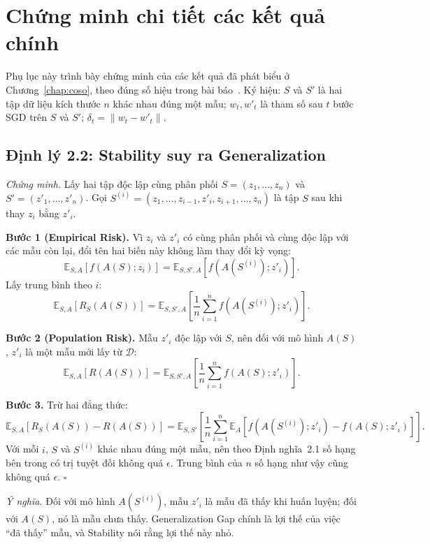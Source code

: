 \chapter{Chứng minh chi tiết các kết quả chính}
\label{app:proofs}

Phụ lục này trình bày chứng minh của các kết quả đã phát biểu ở Chương~\ref{chap:coso}, theo đúng số hiệu trong bài báo~\cite{hardt2016train}. Ký hiệu: $S$ và $S'$ là hai tập dữ liệu kích thước $n$ khác nhau đúng một mẫu; $w_t, w'_t$ là tham số sau $t$ bước SGD trên $S$ và $S'$; $\delta_t = \|w_t - w'_t\|$.

\section{Định lý 2.2: Stability suy ra Generalization}

\textit{Chứng minh.} Lấy hai tập độc lập cùng phân phối $S = (z_1, \ldots, z_n)$ và $S' = (z'_1, \ldots, z'_n)$. Gọi $S^{(i)} = (z_1, \ldots, z_{i-1}, z'_i, z_{i+1}, \ldots, z_n)$ là tập $S$ sau khi thay $z_i$ bằng $z'_i$.

\textbf{Bước 1 (Empirical Risk).} Vì $z_i$ và $z'_i$ có cùng phân phối và cùng độc lập với các mẫu còn lại, đổi tên hai biến này không làm thay đổi kỳ vọng:
\[
\mathbb{E}_{S,A}\left[f(A(S); z_i)\right] = \mathbb{E}_{S,S',A}\left[f(A(S^{(i)}); z'_i)\right].
\]
Lấy trung bình theo $i$:
\[
\mathbb{E}_{S,A}\left[R_S(A(S))\right] = \mathbb{E}_{S,S',A}\left[\frac{1}{n}\sum_{i=1}^{n} f(A(S^{(i)}); z'_i)\right].
\]

\textbf{Bước 2 (Population Risk).} Mẫu $z'_i$ độc lập với $S$, nên đối với mô hình $A(S)$, $z'_i$ là một mẫu mới lấy từ $\mathcal{D}$:
\[
\mathbb{E}_{S,A}\left[R(A(S))\right] = \mathbb{E}_{S,S',A}\left[\frac{1}{n}\sum_{i=1}^{n} f(A(S); z'_i)\right].
\]

\textbf{Bước 3.} Trừ hai đẳng thức:
\[
\mathbb{E}_{S,A}\left[R_S(A(S)) - R(A(S))\right] = \mathbb{E}_{S,S'}\left[\frac{1}{n}\sum_{i=1}^{n} \mathbb{E}_A\left[f(A(S^{(i)}); z'_i) - f(A(S); z'_i)\right]\right].
\]
Với mỗi $i$, $S$ và $S^{(i)}$ khác nhau đúng một mẫu, nên theo Định nghĩa~2.1 số hạng bên trong có trị tuyệt đối không quá $\epsilon$. Trung bình của $n$ số hạng như vậy cũng không quá $\epsilon$. $\square$

\textit{Ý nghĩa.} Đối với mô hình $A(S^{(i)})$, mẫu $z'_i$ là mẫu đã thấy khi huấn luyện; đối với $A(S)$, nó là mẫu chưa thấy. Generalization Gap chính là lợi thế của việc ``đã thấy'' mẫu, và Stability nói rằng lợi thế này nhỏ.


